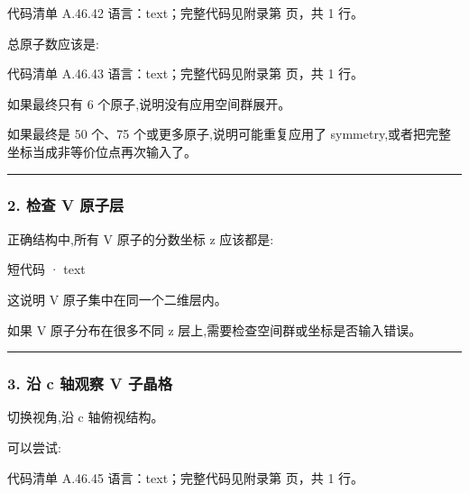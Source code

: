 \documentclass[lang=cn,scheme=chinese,color=blue,device=normal,toc=onecol,math=cm]{elegantbook}
\begin{document}
\begin{codeindexbox}{代码清单 A.46.42}
语言：text；完整代码见附录第 \pageref{code:46:42} 页，共 1 行。
\end{codeindexbox}


总原子数应该是:\par


\begin{codeindexbox}{代码清单 A.46.43}
语言：text；完整代码见附录第 \pageref{code:46:43} 页，共 1 行。
\end{codeindexbox}


如果最终只有 6 个原子,说明没有应用空间群展开。\par


如果最终是 50 个、75 个或更多原子,说明可能重复应用了 symmetry,或者把完整坐标当成非等价位点再次输入了。\par


\medskip\hrule\medskip


\subsubsection{2. 检查 V 原子层}


正确结构中,所有 V 原子的分数坐标 z 应该都是:\par


\begin{inlinecodebox}{短代码 · text}
\end{inlinecodebox}


这说明 V 原子集中在同一个二维层内。\par


如果 V 原子分布在很多不同 z 层上,需要检查空间群或坐标是否输入错误。\par


\medskip\hrule\medskip


\subsubsection{3. 沿 c 轴观察 V 子晶格}


切换视角,沿 c 轴俯视结构。\par


可以尝试:\par


\begin{codeindexbox}{代码清单 A.46.45}
语言：text；完整代码见附录第 \pageref{code:46:45} 页，共 1 行。
\end{codeindexbox}
\end{document}
